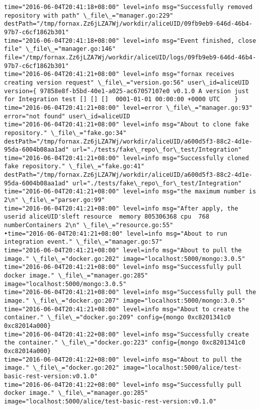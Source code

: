 \begin{lstlisting}[caption={Fornax功能性测试日志}]
time="2016-06-04T20:41:18+08:00" level=info msg="Successfully removed repository with path" \_file\_="manager.go:229" destPath="/tmp/fornax.Zz6jLZA7Wj/workdir/aliceUID/09fb9eb9-646d-46b4-97b7-c6cf1862b301" 
time="2016-06-04T20:41:18+08:00" level=info msg="Event finished, close file" \_file\_="manager.go:146" file="/tmp/fornax.Zz6jLZA7Wj/workdir/aliceUID/logs/09fb9eb9-646d-46b4-97b7-c6cf1862b301" 
time="2016-06-04T20:41:21+08:00" level=info msg="fornax receives creating version request" \_file\_="version.go:56" user\_id=aliceUID version={ 97858e8f-b5bd-40e1-a025-ac67057107e0 v0.1.0 A version just for Integration test [] [] []  0001-01-01 00:00:00 +0000 UTC    } 
time="2016-06-04T20:41:21+08:00" level=error \_file\_="manager.go:93" error="not found" user\_id=aliceUID 
time="2016-06-04T20:41:21+08:00" level=info msg="About to clone fake repository." \_file\_="fake.go:34" destPath="/tmp/fornax.Zz6jLZA7Wj/workdir/aliceUID/a600d5f3-88c2-4d1e-95da-6004b08aa1ad" url="./tests/fake\_repo\_for\_test/Integration" 
time="2016-06-04T20:41:21+08:00" level=info msg="Successfully cloned fake repository." \_file\_="fake.go:41" destPath="/tmp/fornax.Zz6jLZA7Wj/workdir/aliceUID/a600d5f3-88c2-4d1e-95da-6004b08aa1ad" url="./tests/fake\_repo\_for\_test/Integration" 
time="2016-06-04T20:41:21+08:00" level=info msg="the maximum number is 2\n" \_file\_="parser.go:99" 
time="2016-06-04T20:41:21+08:00" level=info msg="After apply, the userid aliceUID'sleft resource  memory 805306368 cpu  768 numberContainers 2\n" \_file\_="resource.go:55" 
•time="2016-06-04T20:41:21+08:00" level=info msg="About to run integration event." \_file\_="manager.go:57" 
time="2016-06-04T20:41:21+08:00" level=info msg="About to pull the image." \_file\_="docker.go:202" image="localhost:5000/mongo:3.0.5" 
time="2016-06-04T20:41:21+08:00" level=info msg="Successfully pull docker image." \_file\_="manager.go:285" image="localhost:5000/mongo:3.0.5" 
time="2016-06-04T20:41:21+08:00" level=info msg="Successfully pull the image." \_file\_="docker.go:207" image="localhost:5000/mongo:3.0.5" 
time="2016-06-04T20:41:21+08:00" level=info msg="About to create the container." \_file\_="docker.go:209" config={mongo 0xc8201341c0 0xc82014a000} 
time="2016-06-04T20:41:22+08:00" level=info msg="Successfully create the container." \_file\_="docker.go:223" config={mongo 0xc8201341c0 0xc82014a000} 
time="2016-06-04T20:41:22+08:00" level=info msg="About to pull the image." \_file\_="docker.go:202" image="localhost:5000/alice/test-basic-rest-version:v0.1.0" 
time="2016-06-04T20:41:22+08:00" level=info msg="Successfully pull docker image." \_file\_="manager.go:285" image="localhost:5000/alice/test-basic-rest-version:v0.1.0" 

\end{lstlisting}
